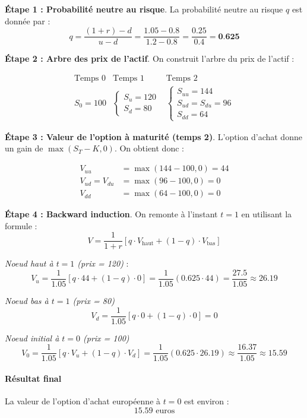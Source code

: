 \documentclass[12pt,a4paper]{article}
\begin{document}
\noindent \textbf{Étape 1 : Probabilité neutre au risque}. La probabilité neutre au risque $q$ est donnée par :
\[
q = \frac{(1 + r) - d}{u - d} = \frac{1.05 - 0.8}{1.2 - 0.8} = \frac{0.25}{0.4} = \textbf{0.625}
\]

\noindent \textbf{Étape 2 : Arbre des prix de l’actif}. On construit l’arbre du prix de l’actif :

\[
\begin{array}{ccc}
\text{Temps 0} & \text{Temps 1} & \text{Temps 2} \\
S_0 = 100 & \begin{cases}
S_u = 120 \\
S_d = 80
\end{cases}
&
\begin{cases}
S_{uu} = 144 \\
S_{ud} = S_{du} = 96 \\
S_{dd} = 64
\end{cases}
\end{array}
\]

\noindent \textbf{Étape 3 : Valeur de l’option à maturité (temps 2)}. L’option d’achat donne un gain de $\max(S_T - K, 0)$. On obtient donc :

\[
\begin{aligned}
V_{uu} &= \max(144 - 100, 0) = 44 \\
V_{ud} = V_{du} &= \max(96 - 100, 0) = 0 \\
V_{dd} &= \max(64 - 100, 0) = 0
\end{aligned}
\]

\noindent \textbf{Étape 4 : Backward induction}. On remonte à l’instant $t=1$ en utilisant la formule :
\[
V = \frac{1}{1 + r} \left[ q \cdot V_\text{haut} + (1 - q) \cdot V_\text{bas} \right]
\]

\textit{Noeud haut à $t=1$ (prix = 120)} :
\[
V_u = \frac{1}{1.05} \left[ q \cdot 44 + (1 - q) \cdot 0 \right] = \frac{1}{1.05} (0.625 \cdot 44) = \frac{27.5}{1.05} \approx 26.19
\]

\textit{Noeud bas à $t=1$ (prix = 80)}
\[
V_d = \frac{1}{1.05} \left[ q \cdot 0 + (1 - q) \cdot 0 \right] = 0
\]

\textit{Noeud initial à $t=0$ (prix = 100)}
\[
V_0 = \frac{1}{1.05} \left[ q \cdot V_u + (1 - q) \cdot V_d \right] = \frac{1}{1.05} (0.625 \cdot 26.19) \approx \frac{16.37}{1.05} \approx 15.59
\]

\paragraph{Résultat final} La valeur de l’option d’achat européenne à $t=0$ est environ :
\[\boxed{15.59 \text{ euros}}\]
\end{document}
